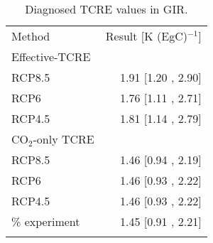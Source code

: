 \documentclass[gmd, manuscript]{copernicus}
\begin{document}
\begin{table}[t]
    \caption{Diagnosed TCRE values in GIR.} \label{tab:TCREresults}
    \begin{tabular}{l r}
    \tophline
        Method & Result [K (EgC)$^{-1}$]\\
    \middlehline
        Effective-TCRE & \\
        RCP8.5 & 1.91 [1.20 , 2.90]\\
        RCP6 & 1.76 [1.11 , 2.71]\\
        RCP4.5 & 1.81 [1.14 , 2.79]\\
    \middlehline
        CO$_2$-only TCRE & \\
        RCP8.5 & 1.46 [0.94 , 2.19]\\
        RCP6 & 1.46 [0.93 , 2.22]\\
        RCP4.5 & 1.46 [0.93 , 2.22]\\
    \middlehline
        1\% experiment & 1.45 [0.91 , 2.21]\\
    \bottomhline
    \end{tabular}
    \belowtable{} %
\end{table}
\end{document}
